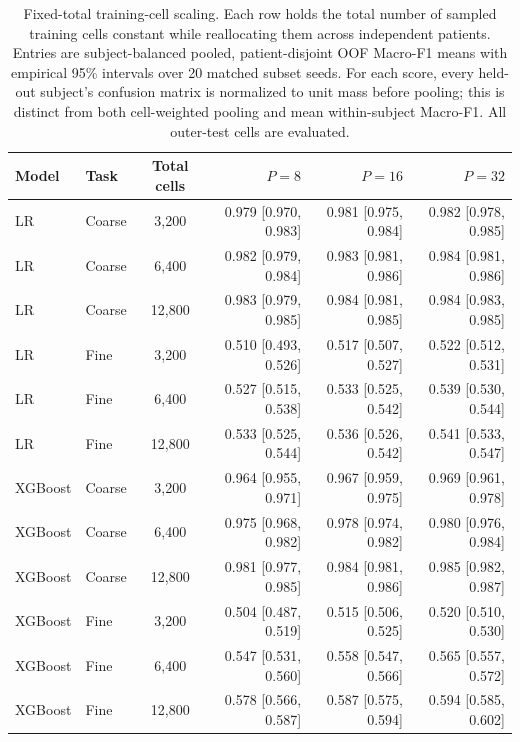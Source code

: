\begin{table}[H]
\centering
\small
\setlength{\tabcolsep}{4pt}
\begin{tabular}{llcrrr}
\toprule
Model & Task & Total cells & $P=8$ & $P=16$ & $P=32$ \\
\midrule
LR & Coarse & 3,200 & 0.979 [0.970, 0.983] & 0.981 [0.975, 0.984] & 0.982 [0.978, 0.985] \\
LR & Coarse & 6,400 & 0.982 [0.979, 0.984] & 0.983 [0.981, 0.986] & 0.984 [0.981, 0.986] \\
LR & Coarse & 12,800 & 0.983 [0.979, 0.985] & 0.984 [0.981, 0.985] & 0.984 [0.983, 0.985] \\
LR & Fine & 3,200 & 0.510 [0.493, 0.526] & 0.517 [0.507, 0.527] & 0.522 [0.512, 0.531] \\
LR & Fine & 6,400 & 0.527 [0.515, 0.538] & 0.533 [0.525, 0.542] & 0.539 [0.530, 0.544] \\
LR & Fine & 12,800 & 0.533 [0.525, 0.544] & 0.536 [0.526, 0.542] & 0.541 [0.533, 0.547] \\
\midrule
XGBoost & Coarse & 3,200 & 0.964 [0.955, 0.971] & 0.967 [0.959, 0.975] & 0.969 [0.961, 0.978] \\
XGBoost & Coarse & 6,400 & 0.975 [0.968, 0.982] & 0.978 [0.974, 0.982] & 0.980 [0.976, 0.984] \\
XGBoost & Coarse & 12,800 & 0.981 [0.977, 0.985] & 0.984 [0.981, 0.986] & 0.985 [0.982, 0.987] \\
XGBoost & Fine & 3,200 & 0.504 [0.487, 0.519] & 0.515 [0.506, 0.525] & 0.520 [0.510, 0.530] \\
XGBoost & Fine & 6,400 & 0.547 [0.531, 0.560] & 0.558 [0.547, 0.566] & 0.565 [0.557, 0.572] \\
XGBoost & Fine & 12,800 & 0.578 [0.566, 0.587] & 0.587 [0.575, 0.594] & 0.594 [0.585, 0.602] \\
\midrule
\bottomrule
\end{tabular}
\caption{Fixed-total training-cell scaling. Each row holds the total number of sampled training cells constant while reallocating them across independent patients. Entries are subject-balanced pooled, patient-disjoint OOF Macro-F1 means with empirical 95\% intervals over 20 matched subset seeds. For each score, every held-out subject's confusion matrix is normalized to unit mass before pooling; this is distinct from both cell-weighted pooling and mean within-subject Macro-F1. All outer-test cells are evaluated.}
\label{tab:fixed_total_scaling}
\end{table}

